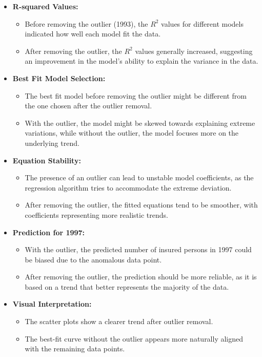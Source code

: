 \documentclass[12pt]{article}
\begin{document}
\begin{itemize}
    \item \textbf{R-squared Values:}
    \begin{itemize}
        \item Before removing the outlier (1993), the \( R^2 \) values for different models indicated how well each model fit the data.
        \item After removing the outlier, the \( R^2 \) values generally increased, suggesting an improvement in the model’s ability to explain the variance in the data.
    \end{itemize}

    \item \textbf{Best Fit Model Selection:}
    \begin{itemize}
        \item The best fit model before removing the outlier might be different from the one chosen after the outlier removal.
        \item With the outlier, the model might be skewed towards explaining extreme variations, while without the outlier, the model focuses more on the underlying trend.
    \end{itemize}

    \item \textbf{Equation Stability:}
    \begin{itemize}
        \item The presence of an outlier can lead to unstable model coefficients, as the regression algorithm tries to accommodate the extreme deviation.
        \item After removing the outlier, the fitted equations tend to be smoother, with coefficients representing more realistic trends.
    \end{itemize}

    \item \textbf{Prediction for 1997:}
    \begin{itemize}
        \item With the outlier, the predicted number of insured persons in 1997 could be biased due to the anomalous data point.
        \item After removing the outlier, the prediction should be more reliable, as it is based on a trend that better represents the majority of the data.
    \end{itemize}

    \item \textbf{Visual Interpretation:}
    \begin{itemize}
        \item The scatter plots show a clearer trend after outlier removal.
        \item The best-fit curve without the outlier appears more naturally aligned with the remaining data points.
    \end{itemize}
\end{itemize}
\end{document}
